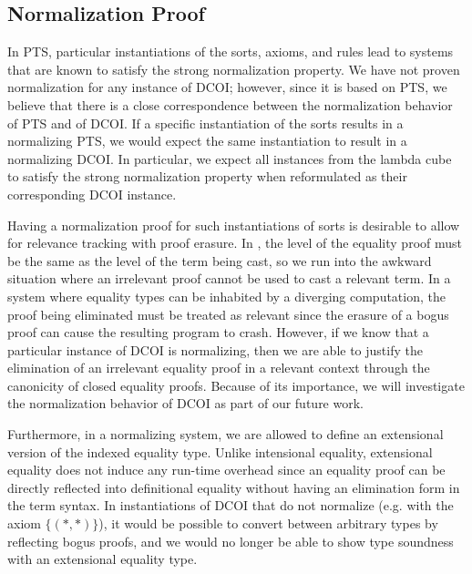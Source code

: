 \documentclass[acmsmall]{acmart}
\newcommand{\yl}[1]{}
\newcommand{\name}{DCOI\xspace}
\begin{document}
\yl{Removed some text here because they were meant to be intuitive
explanations of the conversion rule but I don't find my explanation
intuitive after all..}

\yl{deleted the text here because there's a section that already
  discusses relative irrelevance }
\fi

\subsection{Normalization Proof}
\label{sec:normalization}

In PTS, particular instantiations of the sorts, axioms, and rules lead
to systems that are known to satisfy the strong normalization
property.
We have not proven normalization for any instance of \name{};
however, since it is based on PTS, we believe that there is a close
correspondence between the normalization behavior of PTS and of \name{}.
If a specific instantiation of the sorts results in a
normalizing PTS, we would expect the same instantiation to result in a
normalizing \name{}. In particular, we expect all instances from the
lambda cube~\citep{barendregt1991introduction} to satisfy the strong normalization property when
reformulated as their corresponding \name{} instance.

Having a normalization proof for such instantiations of sorts is
desirable to allow for relevance tracking with proof erasure.
In ,
the level of the equality proof must be the same as the level of the term being cast,
so we run into the awkward situation where an
irrelevant proof cannot be used to cast a relevant term. In a system
where equality types can be inhabited by a diverging computation, the
proof being eliminated must be treated as relevant since the erasure
of a bogus proof can cause the resulting program to crash.
However, if we know that a particular instance of \name{} is normalizing,
then we are able to justify the elimination of an irrelevant equality proof in a
relevant context through the canonicity of closed equality proofs.
Because of its importance, we will investigate the normalization behavior of \name{} as
part of our future work.

\ifextended
Furthermore, in a normalizing system, we are allowed to
define an extensional version of the indexed equality
type. Unlike intensional equality, extensional equality does not
induce any run-time overhead since an equality proof can be directly
reflected into definitional equality without having an elimination
form in the term syntax. In instantiations of \name{} that do not
normalize (e.g. with the axiom $\{(\ast, \ast)\}$),
it would be possible to convert between arbitrary types by
reflecting bogus proofs, and we would no longer be able to show type
soundness with an extensional equality type.
\fi
\end{document}
